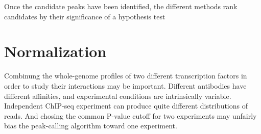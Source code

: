 Once the candidate peaks have been identified, the different methods rank candidates by their significance of a hypothesis test

\section{Normalization}
Combinung the whole-genome profiles of two different transcription factors in order to study their interactions may be important.
Different antibodies have different affinities, and experimental conditions are intrinsically variable.
Independent ChIP-seq experiment can produce quite different distributions of reads.
And chosing the common P-value cutoff for two experiments may unfairly bias the peak-calling algorithm toward one experiment.
